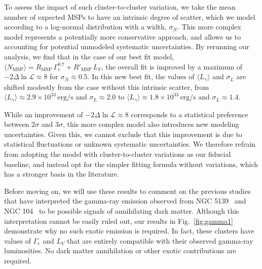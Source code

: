 To assess the impact of such cluster-to-cluster variation, we take the mean number of expected MSPs to have an intrinsic degree of scatter, which we model according to a log-normal distribution with a width, $\sigma_N$. This more complex model represents a potentially more conservative approach, and allows us to accounting for potential unmodeled systematic uncertainties. By rerunning our analysis, we find that in the case of our best fit model, $\langle N_\textrm{MSP}\rangle = R_\textrm{MSP} \, \Gamma_e^{0.7} +R'_\textrm{MSP} \, L_V$, the overall fit is improved by a maximum of $-2\Delta \ln \mathcal{L} \approx 8$ for $\sigma_N \approx 0.5$. In this new best fit, the values of $\langle L_{\gamma} \rangle$ and $\sigma_L$ are shifted modestly from the case without this intrinsic scatter, from $\langle L_{\gamma} \rangle \approx 2.9 \times 10^{33} \, \textrm{erg/s}$ and $\sigma_L \approx 2.0$ to $\langle L_{\gamma} \rangle \approx 1.8\times 10^{33} \, \textrm{erg/s}$ and $\sigma_L \approx 1.4$.

While an improvement of $-2\Delta \ln \mathcal{L} \approx 8$ corresponds to a statistical preference between 2$\sigma$ and 3$\sigma$, this more complex model also introduces new modeling uncertainties. Given this, we cannot exclude that this improvement is due to statistical fluctuations or unknown systematic uncertainties. We therefore refrain from adopting the model with cluster-to-cluster variations as our fiducial baseline, and instead opt for the simpler fitting formula without variations, which has a stronger basis in the literature.



Before moving on, we will use these results to comment on the previous studies that have interpreted the gamma-ray emission observed from NGC 5139~\cite{Reynoso-Cordova:2019biv} and NGC 104~\cite{Brown:2018pwq} to be possible signals of annihilating dark matter. Although this interpretation cannot be easily ruled out, our results in Fig.~\ref{fig:gamma1} demonstrate why no such exotic emission is required. In fact, these clusters have values of $\Gamma_e$ and $L_V$ that are entirely compatible with their observed gamma-ray luminosities. No dark matter annihilation or other exotic contributions are required.  

